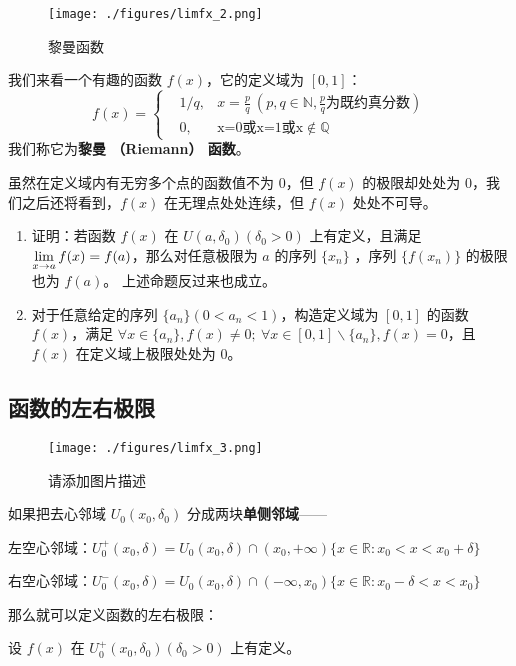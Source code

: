 \begin{figure}[ht]
\centering
\texttt{[image: ./figures/limfx\_2.png]}
\caption{黎曼函数} \label{limfx_fig2}
\end{figure}

我们来看一个有趣的函数 $f(x)$，它的定义域为 $[0,1]$：
\begin{equation}
f(x)=\left\{
\begin{aligned} 
&1/q, &x=\frac{p}{q}\ (p,q\in \mathbb{N},\frac{p}{q}\text{为既约真分数})\\
&0,&\text{x=0或x=1或x}\notin \mathbb{Q}
\end{aligned}
\right.
\end{equation}
我们称它为\textbf{黎曼 （Riemann） 函数}。

虽然在定义域内有无穷多个点的函数值不为 $0$，但 $f(x)$ 的极限却处处为 $0$，我们之后还将看到，$f(x)$ 在无理点处处连续，但 $f(x)$ 处处不可导。

\begin{exercise}{}
\begin{enumerate}
\item 证明：若函数 $f(x)$ 在 $U(a,\delta_0)(\delta_0>0)$ 上有定义，且满足 $\large\lim\limits_{x\rightarrow a}f(x)=f(a)$，那么对任意极限为 $a$ 的序列 $\{x_n\}$ ，序列 $\{f(x_n)\}$ 的极限也为 $f(a)$。
     上述命题反过来也成立。
\item 对于任意给定的序列 $\{a_n\}(0<a_n<1)$，构造定义域为 $[0,1]$ 的函数 $f(x)$，满足 $\forall x\in \{a_n\},f(x)\neq 0;\ \forall x \in [0,1]\backslash \{a_n\},f(x)=0$，且 $f(x)$ 在定义域上极限处处为 $0$。
\end{enumerate}
\end{exercise}
\subsection{函数的左右极限}
\begin{figure}[ht]
\centering
\texttt{[image: ./figures/limfx\_3.png]}
\caption{请添加图片描述} \label{limfx_fig3}
\end{figure}
  如果把去心邻域 $U_0(x_0,\delta_0)$ 分成两块\textbf{单侧邻域}——

  左空心邻域：$U_0^+(x_0,\delta)=U_0(x_0,\delta)\cap (x_0,+\infty) \{x\in \mathbb{R} :x_0< x<x_0+\delta\}$

  右空心邻域：$U_0^-(x_0,\delta)=U_0(x_0,\delta)\cap (-\infty,x_0) \{x\in \mathbb{R} :x_0-\delta< x<x_0\}$

  那么就可以定义函数的左右极限：

  设 $f(x)$ 在 $U^+_0(x_0,\delta_0)(\delta_0>0)$ 上有定义。

